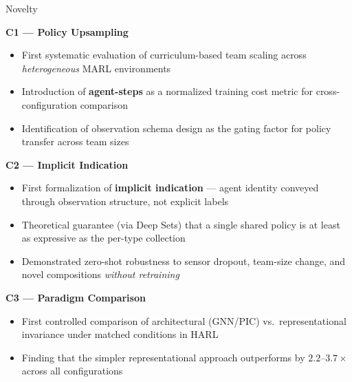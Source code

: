 %
%

\begin{frame}[shrink=15]{Novelty}
    \vspace{2.5em}

    \textbf{C1 — Policy Upsampling}
    \begin{itemize}\small
        \item First systematic evaluation of curriculum-based team scaling
            across \emph{heterogeneous} MARL environments
        \item Introduction of \textbf{agent-steps} as a normalized training
            cost metric for cross-configuration comparison
        \item Identification of observation schema design as the gating factor
            for policy transfer across team sizes
    \end{itemize}

    \textbf{C2 — Implicit Indication}
    \begin{itemize}\small
        \item First formalization of \textbf{implicit indication} — agent
            identity conveyed through observation structure, not explicit labels
        \item Theoretical guarantee (via Deep Sets) that a single shared policy
            is at least as expressive as the per-type collection
        \item Demonstrated zero-shot robustness to sensor dropout, team-size
            change, and novel compositions \emph{without retraining}
    \end{itemize}

    \textbf{C3 — Paradigm Comparison}
    \begin{itemize}\small
        \item First controlled comparison of architectural (GNN/PIC) vs.\
            representational invariance under matched conditions in HARL
        \item Finding that the simpler representational approach outperforms
            by $2.2$--$3.7\times$ across all configurations
    \end{itemize}


\end{frame}
